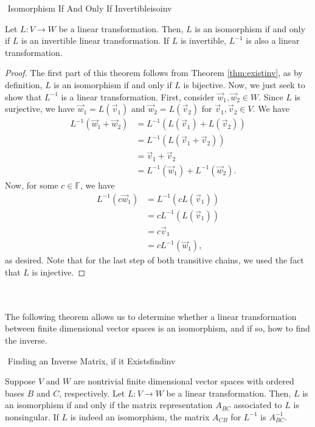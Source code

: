         \begin{theorem}{\Stop\,\,Isomorphism If And Only If Invertible}{isoinv}
            
            Let \(L:V\to W\) be a linear transformation. Then, \(L\) is an isomorphism if and only if \(L\) is an invertible linear transformation. If \(L\) is invertible, \(L^{-1}\) is also a linear transformation.
            \begin{proof}
                The first part of this theorem follows from Theorem \ref{thm:existinv}, as by definition, \(L\) is an isomorphism if and only if \(L\) is bijective. Now, we just seek to show that \(L^{-1}\) is a linear transformation. First, consider \(\vec{w}_1,\vec{w}_2\in W\). Since \(L\) is surjective, we have \(\vec{w}_1=L(\vec{v}_1)\) and \(\vec{w}_2=L(\vec{v}_2)\) for \(\vec{v}_1,\vec{v}_2\in V\). We have
                \begin{align*}
                    L^{-1}(\vec{w}_1+\vec{w}_2)&=L^{-1}(L(\vec{v}_1)+L(\vec{v}_2)) \\
                    &=L^{-1}(L(\vec{v}_1+\vec{v}_2)) \\
                    &=\vec{v}_1+\vec{v}_2 \\
                    &=L^{-1}(\vec{w}_1)+L^{-1}(\vec{w}_2).
                \end{align*}
                Now, for some \(c\in\mathbb{F}\), we have
                \begin{align*}
                    L^{-1}(c\vec{w}_1)&=L^{-1}(cL(\vec{v}_1)) \\
                    &=cL^{-1}(L(\vec{v}_1)) \\
                    &=c\vec{v}_1 \\
                    &=cL^{-1}(\vec{w}_1),
                \end{align*}
                as desired. Note that for the last step of both transitive chains, we used the fact that \(L\) is injective.
            \end{proof}

        \end{theorem}
        \vphantom
        \\
        \\
        The following theorem allows us to determine whether a linear transformation between finite dimensional vector spaces is an isomorphism, and if so, how to find the inverse.
        \begin{theorem}{\Stop\,\,Finding an Inverse Matrix, if it Exists}{findinv}

            Suppose \(V\) and \(W\) are nontrivial finite dimensional vector spaces with ordered bases \(B\) and \(C\), respectively. Let \(L:V\to W\) be a linear transformation. Then, \(L\) is an isomorphism if and only if the matrix representation \(A_{BC}\) associated to \(L\) is nonsingular. If \(L\) is indeed an isomorphism, the matrix \(A_{CB}\) for \(L^{-1}\) is \(A_{BC}^{-1}\).
            
        \end{theorem}
